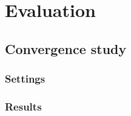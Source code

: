 \section{Evaluation}


\subsection{Convergence study}
\subsubsection{Settings}
\subsubsection{Results}

